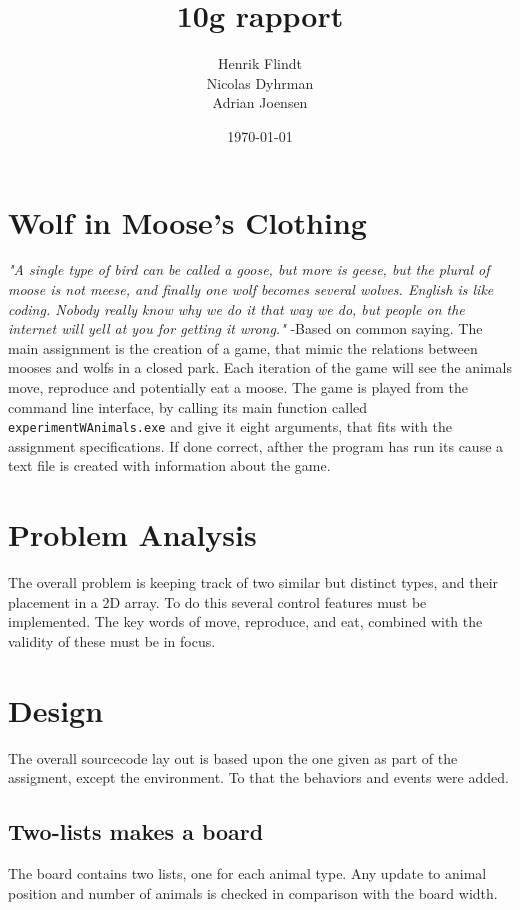 \documentclass{article}
\title{10g rapport}
\author{Henrik Flindt\\Nicolas Dyhrman\\Adrian Joensen}
\date{\today}
\begin{document}
    \maketitle
    
    \section{Wolf in Moose's Clothing}
    \textit{"A single type of bird can be called a goose, but more is geese, but the plural of moose is not meese, and finally one wolf becomes several wolves. English is like coding. Nobody really know why we do it that way we do, but people on the internet will yell at you for getting it wrong."} \newline -Based on common saying. \newline \newline
    The main assignment is the creation of a game, that mimic the relations between mooses and wolfs in a closed park. Each iteration of the game will see the animals move, reproduce and potentially eat a moose. The game is played from the command line interface, by calling its main function called \verb|experimentWAnimals.exe| and give it eight arguments, that fits with the assignment specifications. If done correct, afther the program has run its cause a text file is created with information about the game. 
	\section{Problem Analysis}
	The overall problem is keeping track of two similar but distinct types, and their placement in a 2D array.  To do this several control features must be implemented. The key words of move, reproduce, and eat, combined with the validity of these must be in focus. 

    \section{Design}
    	The overall sourcecode lay out is based upon the one given as part of the assigment, except the environment. To that the behaviors and events were added. 
    
   
   
    \subsection{Two-lists makes a board}
    The board contains two lists, one for each animal type. Any update to animal position and number of animals is checked in comparison with the board width.  
\end{document}
